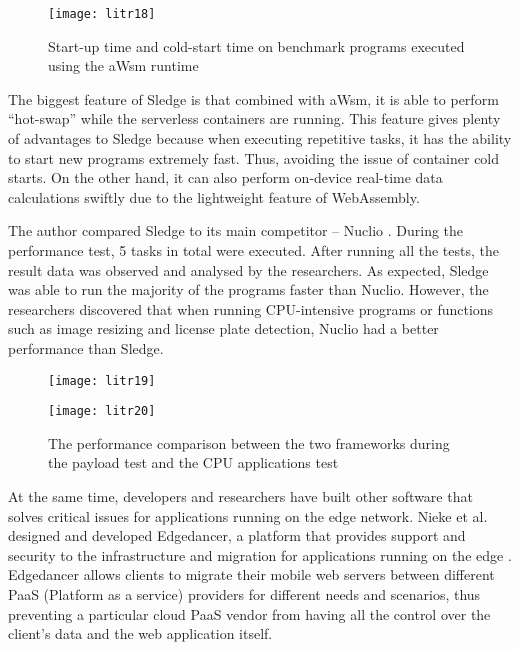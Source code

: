 \begin{figure}[hp]
\centering
\texttt{[image: litr18]}
\caption{\footnotesize{Start-up time and cold-start time on benchmark programs executed using the aWsm runtime \cite{lit33}}}
\captionsetup{aboveskip=0pt,font=it}
\end{figure}

The biggest feature of Sledge is that combined with aWsm, it is able to perform “hot-swap” while the serverless containers are running. This feature gives plenty of advantages to Sledge because when executing repetitive tasks, it has the ability to start new programs extremely fast. Thus, avoiding the issue of container cold starts. On the other hand, it can also perform on-device real-time data calculations swiftly due to the lightweight feature of WebAssembly.

The author compared Sledge to its main competitor – Nuclio \cite{lit35}. During the performance test, 5 tasks in total were executed. After running all the tests, the result data was observed and analysed by the researchers. As expected, Sledge was able to run the majority of the programs faster than Nuclio. However, the researchers discovered that when running CPU-intensive programs or functions such as image resizing and license plate detection, Nuclio had a better performance than Sledge.

\bigskip
\begin{figure}[hp]
\centering
\texttt{[image: litr19]}
\captionsetup{aboveskip=0pt,font=it}
\end{figure}
\newpage
\begin{figure}[hp]
\centering
\texttt{[image: litr20]}
\caption{\footnotesize{The performance comparison between the two frameworks during the payload test and the CPU applications test \cite{lit34}}}
\captionsetup{aboveskip=0pt,font=it}
\end{figure}
\bigskip

At the same time, developers and researchers have built other software that solves critical issues for applications running on the edge network. Nieke et al. designed and developed Edgedancer, a platform that provides support and security to the infrastructure and migration for applications running on the edge \cite{lit37}. Edgedancer allows clients to migrate their mobile web servers between different PaaS (Platform as a service) providers for different needs and scenarios, thus preventing a particular cloud PaaS vendor from having all the control over the client’s data and the web application itself.

